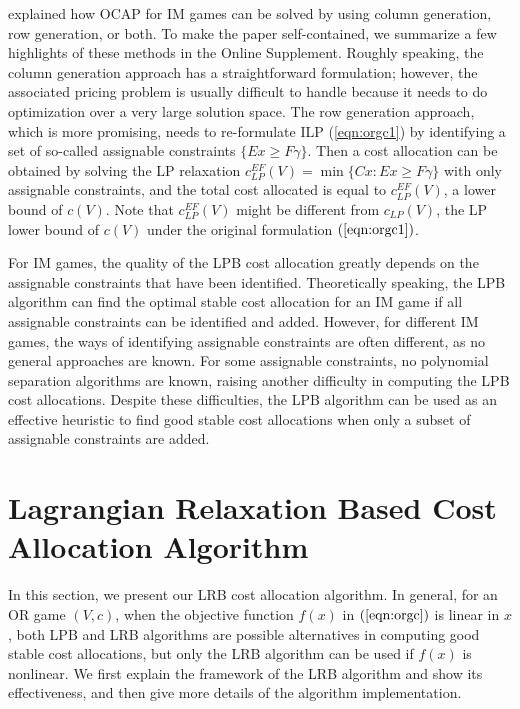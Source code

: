\documentclass[ijoc,nonblindrev]{informs3} %
\begin{document}
\cite{Caprara2010LPB} explained how OCAP for IM games can be solved by using column generation, row generation, or both. To make the paper self-contained, we summarize a few highlights of these methods in the Online Supplement.
Roughly speaking, the column generation approach has  a straightforward formulation; however, the associated pricing problem is usually difficult to handle because it needs to do optimization over a very large solution  space. The row generation approach, which is more promising, needs to re-formulate ILP (\ref{eqn:orgc1}) by identifying a set of so-called assignable constraints $\{ Ex \geq F\gamma\}$. Then a cost allocation can be obtained by solving the LP relaxation $c_{LP}^{EF}(V)=\min\{ Cx : Ex \geq F\gamma\}$ with only assignable constraints, and the total cost allocated is equal to  $c_{LP}^{EF}(V)$,  a lower bound of $c(V)$. Note that  $c_{LP}^{EF}(V)$ might be different from $c_{LP}(V)$, the LP lower bound of $c(V)$ under the original formulation $(\ref{eqn:orgc1})$.


For IM games, the quality of the LPB cost allocation greatly depends on the assignable constraints that have been identified.
Theoretically speaking, the LPB algorithm can find the optimal stable cost allocation for an IM game if all assignable constraints can be identified and added.
However, for different IM games, the ways of identifying assignable constraints are often different, as no general approaches are known.
For some assignable constraints, no polynomial separation algorithms are known, raising another difficulty in computing the LPB cost allocations.
Despite these difficulties, the LPB algorithm can be used as an effective heuristic to find good stable cost allocations when only a subset of assignable constraints are added.



\section{Lagrangian Relaxation Based Cost Allocation Algorithm} \label{section:lrbmethod}
 In this section, we present our LRB cost allocation algorithm. In general, for an OR game $(V,c)$, when the objective function $f(x)$ in $(\ref{eqn:orgc})$ is linear in $x$, both LPB and LRB algorithms are possible alternatives in computing good stable cost allocations, but only the LRB algorithm can be used if $f(x)$ is nonlinear.
We first explain the framework of the LRB algorithm and show its effectiveness, and then give more details of the algorithm implementation.
\end{document}

